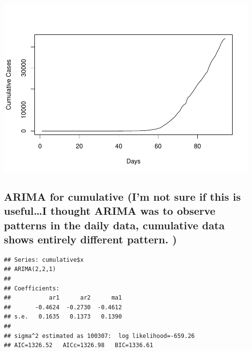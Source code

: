 \documentclass[]{article}
\newenvironment{Shaded}{\begin{snugshade}}{\end{snugshade}}
\newcommand{\CommentTok}[1]{\textcolor[rgb]{0.56,0.35,0.01}{\textit{#1}}}
\newcommand{\DataTypeTok}[1]{\textcolor[rgb]{0.13,0.29,0.53}{#1}}
\newcommand{\KeywordTok}[1]{\textcolor[rgb]{0.13,0.29,0.53}{\textbf{#1}}}
\newcommand{\NormalTok}[1]{#1}
\newcommand{\OperatorTok}[1]{\textcolor[rgb]{0.81,0.36,0.00}{\textbf{#1}}}
\newcommand{\StringTok}[1]{\textcolor[rgb]{0.31,0.60,0.02}{#1}}
\begin{document}
\includegraphics{Covid19Canada_files/figure-latex/unnamed-chunk-5-1.pdf}

\hypertarget{arima-for-cumulative-im-not-sure-if-this-is-usefuli-thought-arima-was-to-observe-patterns-in-the-daily-data-cumulative-data-shows-entirely-different-pattern.}{%
\subsection{ARIMA for cumulative (I'm not sure if this is useful\ldots I
thought ARIMA was to observe patterns in the daily data, cumulative data
shows entirely different pattern.
)}\label{arima-for-cumulative-im-not-sure-if-this-is-usefuli-thought-arima-was-to-observe-patterns-in-the-daily-data-cumulative-data-shows-entirely-different-pattern.}}

\begin{Shaded}
\end{Shaded}

\begin{verbatim}
## Series: cumulative$x 
## ARIMA(2,2,1) 
## 
## Coefficients:
##           ar1      ar2      ma1
##       -0.4624  -0.2730  -0.4612
## s.e.   0.1635   0.1373   0.1390
## 
## sigma^2 estimated as 100307:  log likelihood=-659.26
## AIC=1326.52   AICc=1326.98   BIC=1336.61
\end{verbatim}
\end{document}
